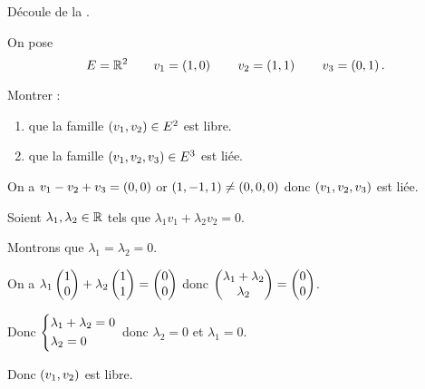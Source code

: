\begin{dem}
Découle de la .
\end{dem}

\begin{exoex}
On pose \[E=\mathbb{R}^2\qquad v_1=\left(1,0\right)\qquad v_2=\left(1,1\right)\qquad v_3=\left(0,1\right).\]

Montrer :

\begin{enumerate}
\item que la famille \(\left(v_1,v_2\right)\in E^2\) est libre. \\

\item que la famille \(\left(v_1,v_2,v_3\right)\in E^3\) est liée.
\end{enumerate}
\end{exoex}

\begin{corr}[2]
On a \(v_1-v_2+v_3=\left(0,0\right)\) or \(\left(1,-1,1\right)\not=\left(0,0,0\right)\) donc \(\left(v_1,v_2,v_3\right)\) est liée.
\end{corr}

\begin{corr}[1]
Soient \(\lambda_1,\lambda_2\in\mathbb{R}\) tels que \(\lambda_1v_1+\lambda_2v_2=0\).

Montrons que \(\lambda_1=\lambda_2=0\).

On a \(\lambda_1\begin{pmatrix}1\\0\end{pmatrix}+\lambda_2\begin{pmatrix}1\\1\end{pmatrix}=\begin{pmatrix}0\\0\end{pmatrix}\) donc \(\begin{pmatrix}\lambda_1+\lambda_2\\\lambda_2\end{pmatrix}=\begin{pmatrix}0\\0\end{pmatrix}\).

Donc \(\begin{dcases}
\lambda_1+\lambda_2=0 \\
\lambda_2=0
\end{dcases}\) donc \(\lambda_2=0\) et \(\lambda_1=0\).

Donc \(\left(v_1,v_2\right)\) est libre.
\end{corr}

